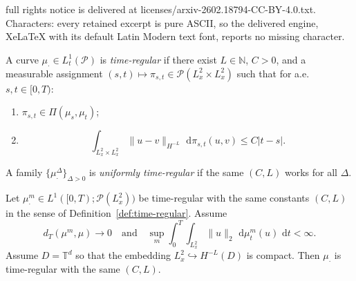 \documentclass[10pt,a4paper]{amsart}
\newcommand{\N}{\mathbb{N}}
\newcommand{\Pcal}{\mathcal{P}}
\newcommand{\T}{\mathbb{T}}
\newcommand{\dd}{\,\mathrm{d}}
\begin{document}
full rights notice is delivered at licenses/arxiv-2602.18794-CC-BY-4.0.txt. Characters: every retained excerpt is pure ASCII, so the delivered engine, XeLaTeX with its default Latin Modern text font, reports no missing character.
\begin{definition}\label{def:time-regular}
A curve $\mu_\cdot\in L^1_t(\Pcal)$ is \emph{time-regular} if there exist $L\in\N$, $C>0$, and a measurable assignment
$(s,t)\mapsto\pi_{s,t}\in\Pcal(L^2_x\times L^2_x)$ such that for a.e.\ $s,t\in[0,T)$:
\begin{enumerate}[label=(\roman*),leftmargin=2.2em]
\item $\pi_{s,t}\in\Pi(\mu_s,\mu_t)$;
\item \begin{equation}\label{eq:time-reg}
\int_{L^2_x\times L^2_x}\|u-v\|_{H^{-L}}\,\dd\pi_{s,t}(u,v)\le C|t-s|.
\end{equation}
\end{enumerate}
A family $\{\mu^\Delta_\cdot\}_{\Delta>0}$ is \emph{uniformly time-regular} if the same $(C,L)$ works for all $\Delta$.
\end{definition}

\begin{lemma}
\label{lem:time-reg-closed}
Let $\mu^m_\cdot\in L^1([0,T);\Pcal(L^2_x))$ be time-regular with the same constants $(C,L)$ in the sense of
Definition~\ref{def:time-regular}. Assume
\[
d_T(\mu^m,\mu)\to 0
\quad\text{and}\quad
\sup_m\int_0^T\int_{L^2_x}\|u\|_2\,\dd\mu^m_t(u)\,\dd t<\infty.
\]
Assume $D=\T^d$ so that the embedding $L^2_x\hookrightarrow H^{-L}(D)$ is compact.
Then $\mu_\cdot$ is time-regular with the same $(C,L)$.
\end{lemma}
\end{document}
